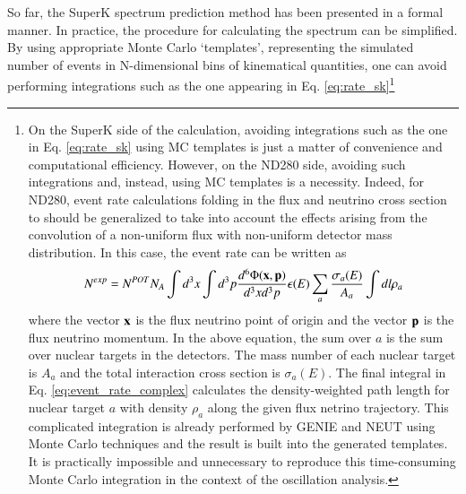 So far, the SuperK spectrum prediction method has been presented in a formal manner.
In practice, the procedure for calculating the spectrum can be simplified.
By using appropriate Monte Carlo `templates', representing the simulated number of
events in N-dimensional bins of kinematical quantities,
one can avoid performing integrations such as the one appearing 
in Eq. \ref{eq:rate_sk}\footnote
{
  On the SuperK side of the calculation, 
  avoiding integrations such as the one in Eq. \ref{eq:rate_sk} using MC templates
  is just a matter of convenience and computational efficiency.
  However, on the ND280 side, avoiding such integrations and, instead, using MC templates 
  is a necessity.
  Indeed, for ND280, event rate calculations folding in the flux and neutrino cross section to
  should be generalized to take into account the effects arising from the convolution of a 
  non-uniform flux with non-uniform detector mass distribution. In this case, the event rate
  can be written as
  \begin{equation}
    \displaystyle
       N^{exp} = N^{POT} N_{A} 
            \int d^{3}x \int d^{3}p 
            \frac{d^{6}\Phi({\bf x},{\bf p})}{d^{3}xd^{3}p} 
            \epsilon(E) 
            \sum_{a} \frac{\sigma_{a}(E)}{A_{a}} \int dl\rho_{a}
       \label{eq:event_rate_complex}
  \end{equation}
  where 
  the vector ${\bf x}$ is the flux neutrino point of origin and
  the vector ${\bf p}$ is the flux neutrino momentum.
  In the above equation, the sum over $a$ is the sum over nuclear targets in the detectors.
  The mass number of each nuclear target is $A_{a}$ and the total interaction cross section is $\sigma_{a}(E)$.
  The final integral in Eq. \ref{eq:event_rate_complex} calculates the density-weighted path length
  for nuclear target $a$ with density $\rho_{a}$ along the given flux netrino trajectory.
  This complicated integration is already performed by GENIE and NEUT using Monte Carlo techniques
  and the result is built into the generated templates.
  It is practically impossible and unnecessary to reproduce this time-consuming Monte Carlo
  integration in the context of the oscillation analysis.
}

